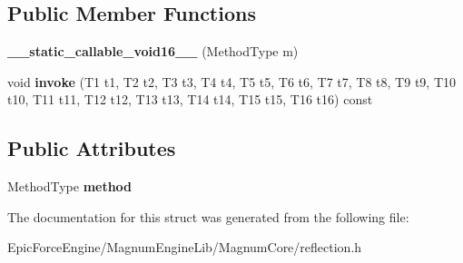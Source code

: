 \subsection*{Public Member Functions}
\begin{DoxyCompactItemize}
\item 
{\bfseries \+\_\+\+\_\+static\+\_\+callable\+\_\+void16\+\_\+\+\_\+} (Method\+Type m)\hypertarget{structagm_1_1reflection_1_1____static__callable__void16_____a1f36639c2a91283d06d89128ce95d167}{}\label{structagm_1_1reflection_1_1____static__callable__void16_____a1f36639c2a91283d06d89128ce95d167}

\item 
void {\bfseries invoke} (T1 t1, T2 t2, T3 t3, T4 t4, T5 t5, T6 t6, T7 t7, T8 t8, T9 t9, T10 t10, T11 t11, T12 t12, T13 t13, T14 t14, T15 t15, T16 t16) const \hypertarget{structagm_1_1reflection_1_1____static__callable__void16_____a490ca661ce2b95378def95175feac44a}{}\label{structagm_1_1reflection_1_1____static__callable__void16_____a490ca661ce2b95378def95175feac44a}

\end{DoxyCompactItemize}
\subsection*{Public Attributes}
\begin{DoxyCompactItemize}
\item 
Method\+Type {\bfseries method}\hypertarget{structagm_1_1reflection_1_1____static__callable__void16_____a81248ee8c4b891606d36b756505b898a}{}\label{structagm_1_1reflection_1_1____static__callable__void16_____a81248ee8c4b891606d36b756505b898a}

\end{DoxyCompactItemize}


The documentation for this struct was generated from the following file\+:\begin{DoxyCompactItemize}
\item 
Epic\+Force\+Engine/\+Magnum\+Engine\+Lib/\+Magnum\+Core/reflection.\+h\end{DoxyCompactItemize}

